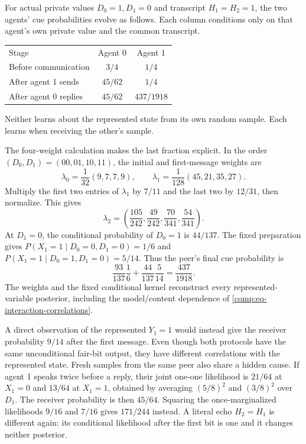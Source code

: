 For actual private values $D_0=1,D_1=0$ and transcript $H_1=H_2=1$, the two agents' cue probabilities evolve as follows. Each column conditions only on that agent's own private value and the common transcript.
\begin{center}
\begin{tabular}{lcc}
Stage & Agent 0 & Agent 1\\
Before communication & $3/4$ & $1/4$\\
After agent 1 sends & $45/62$ & $1/4$\\
After agent 0 replies & $45/62$ & $437/1918$
\end{tabular}
\end{center}
Neither learns about the represented state from its own random sample. Each learns when receiving the other's sample.

The four-weight calculation makes the last fraction explicit. In the order $(D_0,D_1)=(00,01,10,11)$, the initial and first-message weights are
\begin{equation}
\lambda_0=\frac1{32}(9,7,7,9),\qquad
\lambda_1=\frac1{128}(45,21,35,27).
\end{equation}
Multiply the first two entries of $\lambda_1$ by $7/11$ and the last two by $12/31$, then normalize. This gives
\begin{equation}
\lambda_2=
\left(\frac{105}{242},\frac{49}{242},\frac{70}{341},\frac{54}{341}\right).
\end{equation}
At $D_1=0$, the conditional probability of $D_0=1$ is $44/137$. The fixed preparation gives $P(X_1=1\mid D_0=0,D_1=0)=1/6$ and $P(X_1=1\mid D_0=1,D_1=0)=5/14$. Thus the peer's final cue probability is
\begin{equation}
\frac{93}{137}\frac16+\frac{44}{137}\frac5{14}
=\frac{437}{1918}.
\end{equation}
The weights and the fixed conditional kernel reconstruct every represented-variable posterior, including the model/content dependence of \cref{comp:eq-interaction-correlations}.

A direct observation of the represented $Y_1=1$ would instead give the receiver probability $9/14$ after the first message. Even though both protocols have the same unconditional fair-bit output, they have different correlations with the represented state. Fresh samples from the same peer also share a hidden cause. If agent 1 speaks twice before a reply, their joint one-one likelihood is $21/64$ at $X_1=0$ and $13/64$ at $X_1=1$, obtained by averaging $(5/8)^2$ and $(3/8)^2$ over $D_1$. The receiver probability is then $45/64$. Squaring the once-marginalized likelihoods $9/16$ and $7/16$ gives $171/244$ instead. A literal echo $H_2=H_1$ is different again: its conditional likelihood after the first bit is one and it changes neither posterior.

